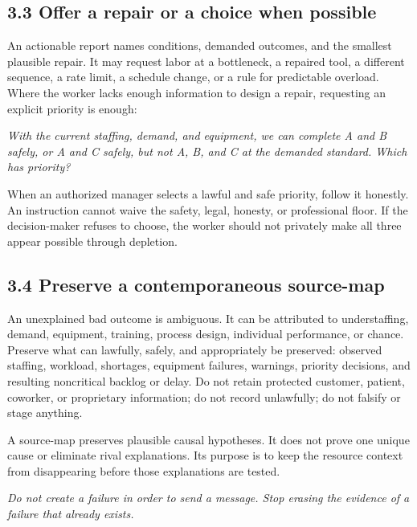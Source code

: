\documentclass[11pt,oneside]{article}
\renewenvironment{quote}
  {\begin{tcolorbox}[
      enhanced,
      breakable,
      colback=ManifestLight,
      colframe=ManifestRule,
      boxrule=0pt,
      leftrule=3pt,
      arc=0pt,
      outer arc=0pt,
      left=10pt,right=10pt,top=8pt,bottom=8pt,
      before skip=0.8em,after skip=0.8em
    ]\itshape}
  {\end{tcolorbox}}
\begin{document}
\hypertarget{offer-a-repair-or-a-choice-when-possible}{%
\subsection{3.3 Offer a repair or a choice when
possible}\label{offer-a-repair-or-a-choice-when-possible}}

An actionable report names conditions, demanded outcomes, and the
smallest plausible repair. It may request labor at a bottleneck, a
repaired tool, a different sequence, a rate limit, a schedule change, or
a rule for predictable overload. Where the worker lacks enough
information to design a repair, requesting an explicit priority is
enough:

\begin{quote}
With the current staffing, demand, and equipment, we can complete A and
B safely, or A and C safely, but not A, B, and C at the demanded
standard. Which has priority?
\end{quote}

When an authorized manager selects a lawful and safe priority, follow it
honestly. An instruction cannot waive the safety, legal, honesty, or
professional floor. If the decision-maker refuses to choose, the worker
should not privately make all three appear possible through depletion.

\hypertarget{preserve-a-contemporaneous-source-map}{%
\subsection{3.4 Preserve a contemporaneous
source-map}\label{preserve-a-contemporaneous-source-map}}

An unexplained bad outcome is ambiguous. It can be attributed to
understaffing, demand, equipment, training, process design, individual
performance, or chance. Preserve what can lawfully, safely, and
appropriately be preserved: observed staffing, workload, shortages,
equipment failures, warnings, priority decisions, and resulting
noncritical backlog or delay. Do not retain protected customer, patient,
coworker, or proprietary information; do not record unlawfully; do not
falsify or stage anything.

A source-map preserves plausible causal hypotheses. It does not prove
one unique cause or eliminate rival explanations. Its purpose is to keep
the resource context from disappearing before those explanations are
tested.

\begin{quote}
Do not create a failure in order to send a message. Stop erasing the
evidence of a failure that already exists.
\end{quote}
\end{document}
